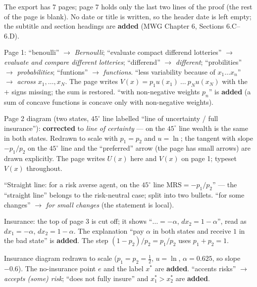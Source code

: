 \documentclass[11pt]{article}
\begin{document}
\begin{transcriptnotes}
  \item The export has 7 pages; page 7 holds only the last two lines of the proof
        (the rest of the page is blank). No date or title is written, so the header
        date is left empty; the subtitle and section headings are \textbf{added}
        (MWG Chapter 6, Sections 6.C--6.D).
  \item Page 1: ``benoulli'' $\to$ \emph{Bernoulli}; ``evaluate compact differend
        lotteries'' $\to$ \emph{evaluate and compare different lotteries};
        ``differend'' $\to$ \emph{different}; ``probilities'' $\to$
        \emph{probabilities}; ``funtions'' $\to$ \emph{functions}. ``less variability
        because of $x_1\dots x_n$'' $\to$ \emph{across $x_1,\dots,x_N$}. The page
        writes $V(x)=p_1u(x_1)\ \dots\ p_Nu(x_N)$ with the $+$ signs missing; the sum
        is restored. ``with non-negative weights $p_n$'' is \textbf{added} (a sum of
        concave functions is concave only with non-negative weights).
  \item Page 2 diagram (two states, $45^\circ$ line labelled ``line of uncertainty /
        full insurance''): \textbf{corrected} to \emph{line of certainty} --- on the
        $45^\circ$ line wealth is the same in both states. Redrawn to scale with
        $p_1=p_2$ and $u=\ln$; the tangent with slope $-p_1/p_2$ on the $45^\circ$
        line and the ``preferred'' arrow (the page has small arrows) are drawn
        explicitly. The page writes $U(x)$ here and $V(x)$ on page 1; typeset $V(x)$
        throughout.
  \item ``Straight line: for a risk averse agent, on the $45^\circ$ line
        $\mathrm{MRS}=-p_1/p_2$'' --- the ``straight line'' belongs to the
        risk-neutral case; split into two bullets. ``for some changes'' $\to$
        \emph{for small changes} (the statement is local).
  \item Insurance: the top of page 3 is cut off; it shows ``$\ldots=-\alpha$,
        $dx_2=1-\alpha$'', read as $dx_1=-\alpha$, $dx_2=1-\alpha$. The explanation
        ``pay $\alpha$ in both states and receive $1$ in the bad state'' is
        \textbf{added}. The step $(1-p_2)/p_2=p_1/p_2$ uses $p_1+p_2=1$.
  \item Insurance diagram redrawn to scale ($p_1=p_2=\tfrac12$, $u=\ln$,
        $\alpha=0.625$, so slope $-0.6$). The no-insurance point $e$ and the label
        $x^*$ are \textbf{added}. ``accents risks'' $\to$ \emph{accepts (some)
        risk}; ``does not fully insure'' and $x_1^*>x_2^*$ are \textbf{added}.

\end{transcriptnotes}
\end{document}
